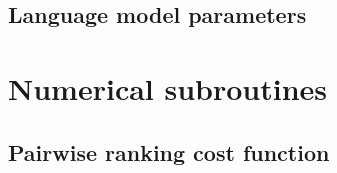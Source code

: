 \subsection{Language model parameters}
\label{sec:nnetworkparams}

% 
% 
\section{Numerical subroutines}
\subsection{Pairwise ranking cost function}
\label{sec:modelcost}

% 